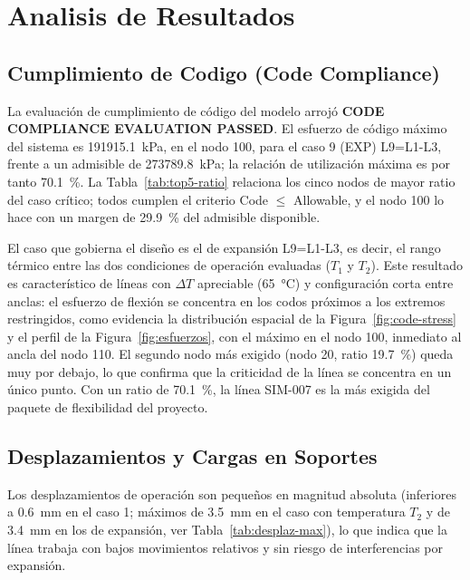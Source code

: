 \section{Analisis de Resultados}
\label{sec:analisis}

\subsection{Cumplimiento de Codigo (Code Compliance)}

La evaluaci\'{o}n de cumplimiento de c\'{o}digo del modelo arroj\'{o}
\textbf{CODE COMPLIANCE EVALUATION PASSED}. El esfuerzo de c\'{o}digo
m\'{a}ximo del sistema es \num{191915.1}~\si{kPa}, en el nodo 100, para el caso
9 (EXP) L9=L1-L3, frente a un admisible de \num{273789.8}~\si{kPa}; la
relaci\'{o}n de utilizaci\'{o}n m\'{a}xima es por tanto 70.1~\%. La
Tabla~\ref{tab:top5-ratio} relaciona los cinco nodos de mayor ratio del caso
cr\'{i}tico; todos cumplen el criterio Code $\leq$ Allowable, y el nodo 100 lo
hace con un margen de 29.9~\% del admisible disponible.



El caso que gobierna el dise\~{n}o es el de expansi\'{o}n L9=L1-L3, es decir,
el rango t\'{e}rmico entre las dos condiciones de operaci\'{o}n evaluadas
($T_1$ y $T_2$). Este resultado es caracter\'{i}stico de l\'{i}neas con
$\Delta T$ apreciable (65~\si{\celsius}) y configuraci\'{o}n corta entre
anclas: el esfuerzo de flexi\'{o}n se concentra en los codos pr\'{o}ximos a
los extremos restringidos, como evidencia la distribuci\'{o}n espacial de la
Figura~\ref{fig:code-stress} y el perfil de la Figura~\ref{fig:esfuerzos}, con
el m\'{a}ximo en el nodo 100, inmediato al ancla del nodo 110. El segundo nodo
m\'{a}s exigido (nodo 20, ratio 19.7~\%) queda muy por debajo, lo que confirma
que la criticidad de la l\'{i}nea se concentra en un \'{u}nico punto. Con un
ratio de 70.1~\%, la l\'{i}nea SIM-007 es la m\'{a}s exigida del paquete de
flexibilidad del proyecto.

\subsection{Desplazamientos y Cargas en Soportes}

Los desplazamientos de operaci\'{o}n son peque\~{n}os en magnitud absoluta
(inferiores a 0.6~\si{mm} en el caso 1; m\'{a}ximos de 3.5~\si{mm} en el caso
con temperatura $T_2$ y de 3.4~\si{mm} en los de expansi\'{o}n, ver
Tabla~\ref{tab:desplaz-max}), lo que indica que la l\'{i}nea trabaja con bajos
movimientos relativos y sin riesgo de interferencias por expansi\'{o}n.

